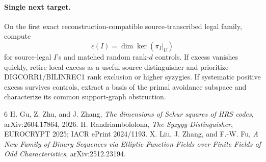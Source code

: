 \documentclass[11pt]{article}
\begin{document}
\paragraph{Single next target.}
On the first exact reconstruction-compatible source-transcribed legal family, compute
\[
\epsilon(I)=\dim\ker(\pi_I|_U)
\]
for source-legal \(I\)'s and matched random rank-\(d\) controls. If excess vanishes quickly, retire local excess as a useful source distinguisher and prioritize DIGCORR1/BILINREC1 rank exclusion or higher syzygies. If systematic positive excess survives controls, extract a basis of the primal avoidance subspace and characterize its common support-graph obstruction.

\begin{thebibliography}{6}
 H. Gu, Z. Zhu, and J. Zhang, \emph{The dimensions of Schur squares of HRS codes}, arXiv:2604.17864, 2026.
 H. Randriambololona, \emph{The Syzygy Distinguisher}, EUROCRYPT 2025; IACR ePrint 2024/1193.
 X. Liu, J. Zhang, and F.-W. Fu, \emph{A New Family of Binary Sequences via Elliptic Function Fields over Finite Fields of Odd Characteristics}, arXiv:2512.23194.
\end{thebibliography}
\end{document}
